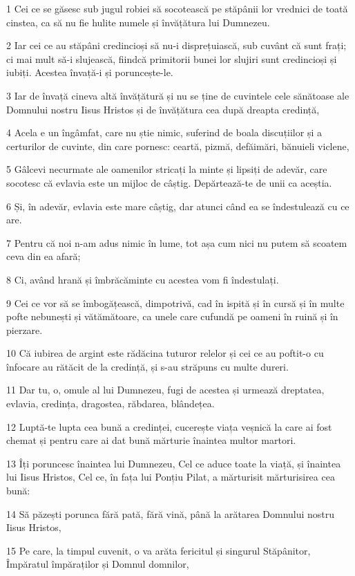 \par 1 Cei ce se găsesc sub jugul robiei să socotească pe stăpânii lor vrednici de toată cinstea, ca să nu fie hulite numele și învățătura lui Dumnezeu.
\par 2 Iar cei ce au stăpâni credincioși să nu-i disprețuiască, sub cuvânt că sunt frați; ci mai mult să-i slujească, fiindcă primitorii bunei lor slujiri sunt credincioși și iubiți. Acestea învață-i și poruncește-le.
\par 3 Iar de învață cineva altă învățătură și nu se ține de cuvintele cele sănătoase ale Domnului nostru Iisus Hristos și de învățătura cea după dreapta credință,
\par 4 Acela e un îngâmfat, care nu știe nimic, suferind de boala discuțiilor și a certurilor de cuvinte, din care pornesc: ceartă, pizmă, defăimări, bănuieli viclene,
\par 5 Gâlcevi necurmate ale oamenilor stricați la minte și lipsiți de adevăr, care socotesc că evlavia este un mijloc de câștig. Depărtează-te de unii ca aceștia.
\par 6 Și, în adevăr, evlavia este mare câștig, dar atunci când ea se îndestulează cu ce are.
\par 7 Pentru că noi n-am adus nimic în lume, tot așa cum nici nu putem să scoatem ceva din ea afară;
\par 8 Ci, având hrană și îmbrăcăminte cu acestea vom fi îndestulați.
\par 9 Cei ce vor să se îmbogățească, dimpotrivă, cad în ispită și în cursă și în multe pofte nebunești și vătămătoare, ca unele care cufundă pe oameni în ruină și în pierzare.
\par 10 Că iubirea de argint este rădăcina tuturor relelor și cei ce au poftit-o cu înfocare au rătăcit de la credință, și s-au străpuns cu multe dureri.
\par 11 Dar tu, o, omule al lui Dumnezeu, fugi de acestea și urmează dreptatea, evlavia, credința, dragostea, răbdarea, blândețea.
\par 12 Luptă-te lupta cea bună a credinței, cucerește viața veșnică la care ai fost chemat și pentru care ai dat bună mărturie înaintea multor martori.
\par 13 Îți poruncesc înaintea lui Dumnezeu, Cel ce aduce toate la viață, și înaintea lui Iisus Hristos, Cel ce, în fața lui Ponțiu Pilat, a mărturisit mărturisirea cea bună:
\par 14 Să păzești porunca fără pată, fără vină, până la arătarea Domnului nostru Iisus Hristos,
\par 15 Pe care, la timpul cuvenit, o va arăta fericitul și singurul Stăpânitor, Împăratul împăraților și Domnul domnilor,
